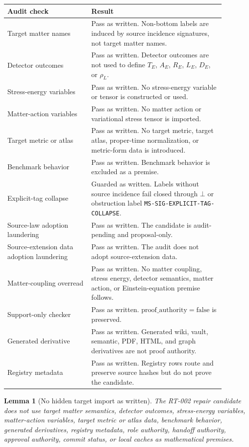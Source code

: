 \documentclass[11pt]{article}
\newcommand{\Bottom}{\bot}
\newcommand{\ProofAuthFalse}{\mathrm{proof\_authority=false}}
\newtheorem{lemma}{Lemma}
\begin{document}
\begin{longtable}{p{0.34\linewidth}p{0.54\linewidth}}
\toprule
Audit check & Result \\
\midrule
Target matter names & Pass as written. Non-bottom labels are induced by source incidence signatures, not target matter names. \\
Detector outcomes & Pass as written. Detector outcomes are not used to define \(T_E\), \(A_E\), \(R_E\), \(L_E\), \(D_E\), or \(\rho_L\). \\
Stress-energy variables & Pass as written. No stress-energy variable or tensor is constructed or used. \\
Matter-action variables & Pass as written. No matter action or variational stress tensor is imported. \\
Target metric or atlas & Pass as written. No target metric, target atlas, proper-time normalization, or metric-form data is introduced. \\
Benchmark behavior & Pass as written. Benchmark behavior is excluded as a premise. \\
Explicit-tag collapse & Guarded as written. Labels without source incidence fail closed through \(\Bottom\) or obstruction label \texttt{MS-SIG-EXPLICIT-TAG-COLLAPSE}. \\
Source-law adoption laundering & Pass as written. The candidate is audit-pending and proposal-only. \\
Source-extension data adoption laundering & Pass as written. The audit does not adopt source-extension data. \\
Matter-coupling overread & Pass as written. No matter coupling, stress energy, detector semantics, matter action, or Einstein-equation premise follows. \\
Support-only checker & Pass as written. \(\ProofAuthFalse\) is preserved. \\
Generated derivative & Pass as written. Generated wiki, vault, semantic, PDF, HTML, and graph derivatives are not proof authority. \\
Registry metadata & Pass as written. Registry rows route and preserve source hashes but do not prove the candidate. \\
\bottomrule
\end{longtable}

\begin{lemma}[No hidden target import as written]
The RT-002 repair candidate does not use target matter semantics, detector
outcomes, stress-energy variables, matter-action variables, target metric or
atlas data, benchmark behavior, generated derivatives, registry metadata,
role authority, handoff authority, approval authority, commit status, or local
caches as mathematical premises.
\end{lemma}
\end{document}
